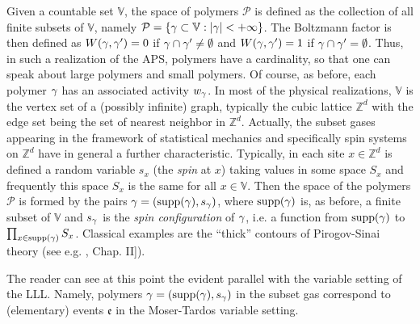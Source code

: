 \documentclass[11pt]{article}
\let\\=\noindent
\let\\=\noindent
\def\VU{{\mathbb{V}}}\def\GI{{\mathbb{G}}}\def\0{\emptyset}\def\Z{\mathbb{Z}}
\def\ev{{\mathfrak{e}}}
\def\PP{{\mathcal P}}\def\EE{{\mathcal E}}
\def\0{\emptyset}
\begin{document}
\\Given  a countable set $\VU$, the space of polymers $\PP$ is defined as the collection of all finite subsets of $\VU$, namely
$\PP=\{\g\subset \VU: |\g|<+\infty\}$. The Boltzmann factor is then defined as $W(\gamma,\gamma')=0$ if $\g\cap\g' \neq\0$ and $W(\gamma,\gamma')=1$ if $\g\cap\g'=\0$. Thus, in such a  realization of the APS,  polymers have
a cardinality, so that one can speak about large  polymers and small polymers. Of course, as before, each
polymer $\gamma$   has an associated  activity $w_\gamma$.
In most of the physical realizations, $\VU$ is the vertex set of
a (possibly  infinite)
graph, typically the cubic lattice $\Z^d$ with the edge set being the set of nearest neighbor in $\Z^d$.
Actually, the subset gases appearing in the framework of statistical mechanics and specifically spin systems on $\Z^d$
have in general   a further characteristic. Typically,  in each site $x\in  \Z^d$  is defined a random variable $s_x$ (the {\it spin} at $x$)
taking values in some space $S_x$ and frequently this space  $S_x$ is the same for all $x\in \VU$. Then  the space of the polymers  $\PP$ is formed by the  pairs
$\gamma = ({\rm supp}(\gamma) , s_\gamma)$, where ${\rm supp}(\gamma)$ is, as before,
a finite subset of $\VU$ and
$s_\gamma$ is the  {\it spin configuration} of $\gamma$, i.e.  a function from ${\rm supp}(\gamma)$ to $\prod_{x\in {\rm supp}(\gamma)}S_x$. Classical  examples are the “thick” contours of
Pirogov-Sinai theory (see e.g. \cite{Si}, Chap. II]).

\\The reader can see at this point the evident parallel with the variable setting of the LLL. Namely,
polymers $\gamma = ({\rm supp}(\gamma) , s_\gamma)$ in the subset gas correspond to (elementary) events  $\ev$ in the Moser-Tardos variable setting.
\end{document}
